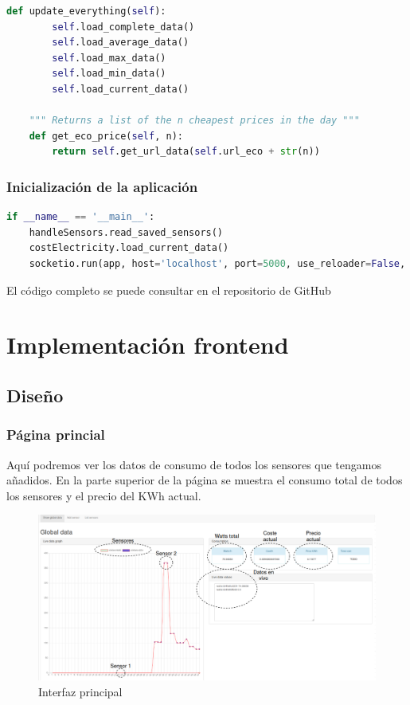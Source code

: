 \begin{titlepage}
\begin{lstlisting}[language=python]
    def update_everything(self):
        self.load_complete_data()
        self.load_average_data()
        self.load_max_data()
        self.load_min_data()
        self.load_current_data()

    """ Returns a list of the n cheapest prices in the day """
    def get_eco_price(self, n):
        return self.get_url_data(self.url_eco + str(n))

\end{lstlisting}

\subsubsection{Inicialización de la aplicación}
\begin{lstlisting}[language=python]
if __name__ == '__main__':
	handleSensors.read_saved_sensors()
	costElectricity.load_current_data()
	socketio.run(app, host='localhost', port=5000, use_reloader=False, debug=True)
\end{lstlisting}

El código completo se puede consultar en el repositorio de GitHub\cite{ref25}
\newpage
\section{Implementación frontend}
\subsection{Diseño}
\subsubsection{Página princial}
Aquí podremos ver los datos de consumo de todos los sensores que tengamos añadidos. En la parte superior de la página se muestra el consumo total de todos los sensores y el precio del KWh actual.\\

\begin{figure}[h!]
	\centering
	\includegraphics[width=1\textwidth]{imagenes/index.png}
	\caption{Interfaz principal}
\end{figure}


\end{titlepage}
